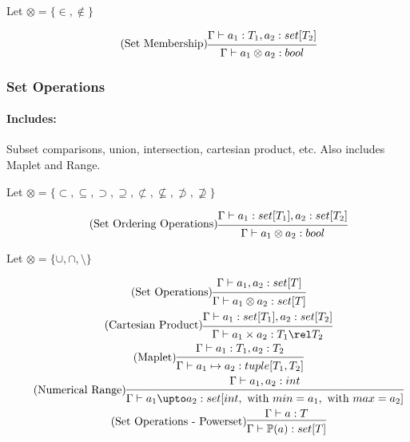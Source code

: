 \documentclass{article}
\begin{document}
Let $\otimes = \{\in, \not\in \}$

\begin{gather}
\tag{Set Membership}
\begin{prooftree}
\hypo{\Gamma \vdash a_1: T_1, a_2: set[T_2]}
\infer1{\Gamma \vdash a_1 \otimes a_2: bool}
\end{prooftree}
\end{gather}

\subsubsection{Set Operations}
\paragraph{Includes:} Subset comparisons, union, intersection, cartesian product, etc. Also includes Maplet and Range.

Let $\otimes = \{\subset, \subseteq, \supset, \supseteq, \not\subset, \not\subseteq, \not\supset, \not\supseteq \}$

\begin{gather}
\tag{Set Ordering Operations}
\begin{prooftree}
\hypo{\Gamma \vdash a_1: set[T_1], a_2: set[T_2]}
\infer1{\Gamma \vdash a_1 \otimes a_2: bool}
\end{prooftree}
\end{gather}

Let $\otimes = \{\cup, \cap, \setminus \}$

\begin{gather}
\tag{Set Operations}
\begin{prooftree}
\hypo{\Gamma \vdash a_1, a_2: set[T]}
\infer1{\Gamma \vdash a_1 \otimes a_2: set[T]}
\end{prooftree}
\\
\tag{Cartesian Product}
\begin{prooftree}
\hypo{\Gamma \vdash a_1: set[T_1], a_2: set[T_2]}
\infer1{\Gamma \vdash a_1 \times a_2: T_1 \rel T_2}
\end{prooftree}
\\
\tag{Maplet}
\begin{prooftree}
\hypo{\Gamma \vdash a_1: T_1, a_2: T_2}
\infer1{\Gamma \vdash a_1 \mapsto a_2: tuple[T_1, T_2]}
\end{prooftree}
\\
\tag{Numerical Range}
\begin{prooftree}
\hypo{\Gamma \vdash a_1, a_2: int}
\infer1{\Gamma \vdash a_1 \upto a_2: set[int, \text{ with } min = a_1, \text{ with } max = a_2]}
\end{prooftree}
\\
\tag{Set Operations - Powerset}
\begin{prooftree}
\hypo{\Gamma \vdash a:T}
\infer1{\Gamma \vdash \mathbb{P}(a):set[T]}
\end{prooftree}
\end{gather}
\end{document}
